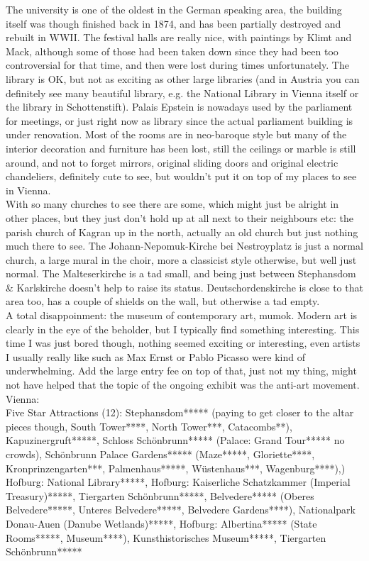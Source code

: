 The university is one of the oldest in the German speaking area, the building itself was though finished back in 1874, and has been partially destroyed and rebuilt in WWII. The festival halls are really nice, with paintings by Klimt and Mack, although some of those had been taken down since they had been too controversial for that time, and then were lost during times unfortunately. The library is OK, but not as exciting as other large libraries (and in Austria you can definitely see many beautiful library, e.g. the National Library in Vienna itself or the library in Schottenstift). Palais Epstein is nowadays used by the parliament for meetings, or just right now as library since the actual parliament building is under renovation. Most of the rooms are in neo-baroque style but many of the interior decoration and furniture has been lost, still the ceilings or marble is still around, and not to forget mirrors, original sliding doors and original electric chandeliers, definitely cute to see, but wouldn't put it on top of my places to see in Vienna.\\

With so many churches to see there are some, which might just be alright in other places, but they just don't hold up at all next to their neighbours etc: the parish church of Kagran up in the north, actually an old church but just nothing much there to see. The Johann-Nepomuk-Kirche bei Nestroyplatz is just a normal church, a large mural in the choir, more a classicist style otherwise, but well just normal. The Malteserkirche is a tad small, and being just between Stephansdom \& Karlskirche doesn't help to raise its status. Deutschordenskirche is close to that area too, has a couple of shields on the wall, but otherwise a tad empty.\\

A total disappoinment: the museum of contemporary art, mumok. Modern art is clearly in the eye of the beholder, but I typically find something interesting. This time I was just bored though, nothing seemed exciting or interesting, even artists I usually really like such as Max Ernst or Pablo Picasso were kind of underwhelming. Add the large entry fee on top of that, just not my thing, might not have helped that the topic of the ongoing exhibit was the anti-art movement.\\


Vienna: \\
Five Star Attractions (12): Stephansdom***** (paying to get closer to the altar pieces though, South Tower****, North Tower***, Catacombs**), Kapuzinergruft*****, Schloss Sch\"onbrunn***** (Palace: Grand Tour***** no crowds), Sch\"onbrunn Palace Gardens***** (Maze*****, Gloriette****, Kronprinzengarten***, Palmenhaus*****, W\"ustenhaus***, Wagenburg****),) Hofburg: National Library*****, Hofburg: Kaiserliche Schatzkammer (Imperial Treasury)*****, Tiergarten Sch\"onbrunn*****, Belvedere***** (Oberes Belvedere*****, Unteres Belvedere*****, Belvedere Gardens****), Nationalpark Donau-Auen (Danube Wetlands)*****, Hofburg: Albertina***** (State Rooms*****, Museum****),  Kunsthistorisches Museum*****, Tiergarten Sch\"onbrunn*****\\

